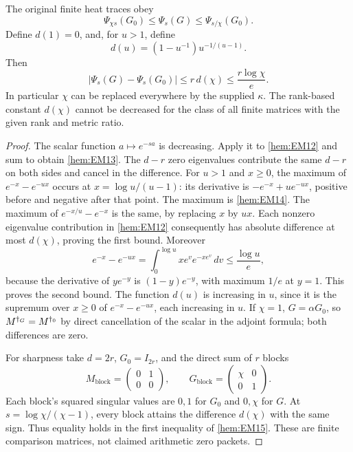 \begin{hemtheorem}
The original finite heat traces obey
\begin{equation}
 \Psi_{\chi s}(G_0)\le\Psi_s(G)\le\Psi_{s/\chi}(G_0).
 \tag{EM13}\label{hem:EM13}
\end{equation}
Define \(d(1)=0\), and, for \(u>1\), define
\begin{equation}
 d(u)=(1-u^{-1})u^{-1/(u-1)}.
 \tag{EM14}\label{hem:EM14}
\end{equation}
Then
\begin{equation}
 |\Psi_s(G)-\Psi_s(G_0)|
 \le r\,d(\chi)\le\frac{r\log\chi}{e}.
 \tag{EM15}\label{hem:EM15}
\end{equation}
In particular \(\chi\) can be replaced everywhere by the supplied
\(\kappa\). The rank-based constant \(d(\chi)\) cannot be decreased for
the class of all finite matrices with the given rank and metric ratio.
\end{hemtheorem}
\begin{proof}
The scalar function \(a\mapsto e^{-sa}\) is decreasing. Apply it to
\eqref{hem:EM12} and sum to obtain \eqref{hem:EM13}. The \(d-r\) zero
eigenvalues contribute the same \(d-r\) on both sides and cancel in
the difference. For \(u>1\) and \(x\ge0\), the maximum of
\(e^{-x}-e^{-ux}\) occurs at \(x=\log u/(u-1)\):
its derivative is \(-e^{-x}+u e^{-ux}\), positive before and negative
after that point. The maximum is \eqref{hem:EM14}. The maximum of
\(e^{-x/u}-e^{-x}\) is the same, by replacing \(x\) by \(ux\).
Each nonzero eigenvalue contribution in \eqref{hem:EM12} consequently has
absolute difference at most \(d(\chi)\), proving the first bound.
Moreover
\[
 e^{-x}-e^{-ux}=\int_0^{\log u}xe^v e^{-xe^v}\,dv
       \le\frac{\log u}{e},
\]
because the derivative of \(y e^{-y}\) is \((1-y)e^{-y}\), with maximum
\(1/e\) at \(y=1\). This proves the second bound.
The function \(d(u)\) is increasing in \(u\), since it is the supremum
over \(x\ge0\) of \(e^{-x}-e^{-ux}\), each increasing in \(u\).
If \(\chi=1\), \(G=\alpha G_0\), so \(M^{\dagger_G}=M^{\dagger_0}\)
by direct cancellation of the scalar in the adjoint formula; both
differences are zero.

For sharpness take \(d=2r\), \(G_0=I_{2r}\), and the direct sum of \(r\)
blocks
\[
 M_{\mathrm{block}}=\begin{pmatrix}0&1\\0&0\end{pmatrix},
 \qquad
 G_{\mathrm{block}}=\begin{pmatrix}\chi&0\\0&1\end{pmatrix}.
\]
Each block's squared singular values are \(0,1\) for \(G_0\) and
\(0,\chi\) for \(G\). At \(s=\log\chi/(\chi-1)\), every block attains
the difference \(d(\chi)\) with the same sign. Thus equality holds
in the first inequality of \eqref{hem:EM15}. These are finite comparison
matrices, not claimed arithmetic zero packets.
\end{proof}

